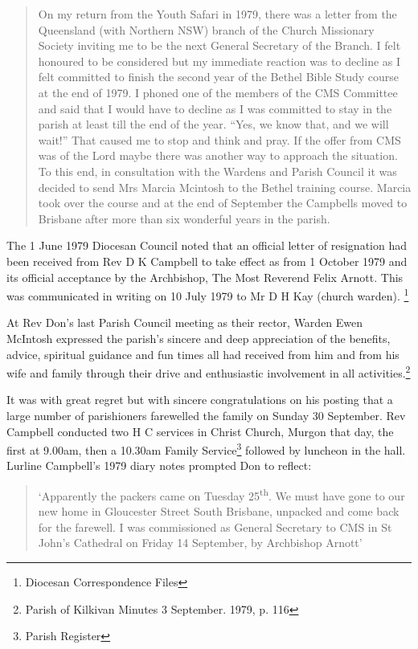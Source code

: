 \begin{quote}
On my return from the Youth Safari in 1979, there was a letter from the
Queensland (with Northern NSW) branch of the Church Missionary Society
inviting me to be the next General Secretary of the Branch. I felt
honoured to be considered but my immediate reaction was to decline as I
felt committed to finish the second year of the Bethel Bible Study
course at the end of 1979. I phoned one of the members of the CMS
Committee and said that I would have to decline as I was committed to
stay in the parish at least till the end of the year. ``Yes, we know
that, and we will wait!'' That caused me to stop and think and pray. If
the offer from CMS was of the Lord maybe there was another way to
approach the situation. To this end, in consultation with the Wardens
and Parish Council it was decided to send Mrs Marcia Mcintosh to the
Bethel training course. Marcia took over the course and at the end of
September the Campbells moved to Brisbane after more than six wonderful
years in the parish.
\end{quote}

The 1 June 1979 Diocesan Council noted that an official letter of
resignation had been received from Rev D K Campbell to take effect as
from 1 October 1979 and its official acceptance by the Archbishop, The
Most Reverend Felix Arnott. This was communicated in writing on 10 July
1979 to Mr D H Kay (church warden). \footnote{Diocesan Correspondence
  Files}

At Rev Don's last Parish Council meeting as their rector, Warden Ewen
McIntosh expressed the parish's sincere and deep appreciation of the
benefits, advice, spiritual guidance and fun times all had received from
him and from his wife and family through their drive and enthusiastic
involvement in all activities.\footnote{Parish of Kilkivan Minutes 3
  September. 1979, p. 116}

It was with great regret but with sincere congratulations on his posting
that a large number of parishioners farewelled the family on Sunday 30
September. Rev Campbell conducted two H C services in Christ Church,
Murgon that day, the first at 9.00am, then a 10.30am Family
Service\footnote{Parish Register} followed by luncheon in the hall.
Lurline Campbell's 1979 diary notes prompted Don to reflect:

\begin{quote}
`Apparently the packers came on Tuesday 25\textsuperscript{th}. We must
have gone to our new home in Gloucester Street South Brisbane, unpacked
and come back for the farewell. I was commissioned as General Secretary
to CMS in St John's Cathedral on Friday 14 September, by Archbishop
Arnott'
\end{quote}

